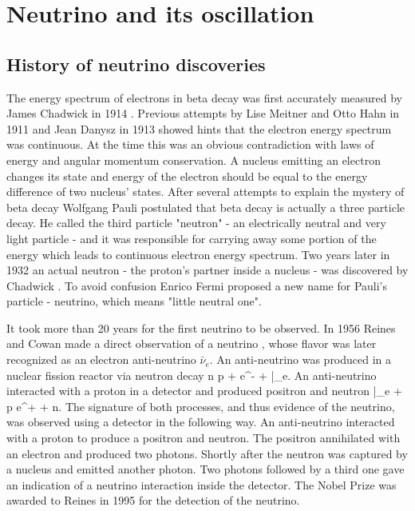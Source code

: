 \chapter{Neutrino and its oscillation}
\label{history_chapter}

\section{History of neutrino discoveries}
The energy spectrum of electrons in beta decay was first accurately measured by James Chadwick 
in 1914 \cite{chadwick}.  Previous attempts by Lise Meitner and Otto Hahn in 1911 and 
Jean Danysz in 1913 showed hints that the electron energy spectrum was continuous. 
At the time this was an obvious contradiction with laws of energy and angular momentum 
conservation. A nucleus emitting an electron changes its state and energy of the 
electron should be equal to the energy difference of two nucleus' states. After 
several attempts to explain the mystery of beta decay Wolfgang Pauli postulated 
\cite{pauli} that beta decay is actually a three particle decay. He called the third 
particle "neutron" - an electrically neutral and very light particle - and it was 
responsible for carrying away some portion of the energy which leads to continuous 
electron energy spectrum. Two years later in 1932 an actual neutron - the proton's 
partner inside a nucleus - was discovered by Chadwick \cite{chadwick2}.  To avoid 
confusion Enrico Fermi proposed a new name for Pauli's particle \cite{fermi} - 
neutrino, which means "little neutral one".

It took more than 20 years for the first neutrino to be observed.  In 1956 Reines 
and Cowan made a direct observation of a neutrino \cite{cowan}, whose flavor was 
later recognized as an electron anti-neutrino $\bar{\nu}_e$. An anti-neutrino was 
produced in a nuclear fission reactor via neutron decay
\be
n \rightarrow p + e^- + \bar{\nu}_e.
\ee
An anti-neutrino interacted with a proton in a detector and produced positron and neutron
\be
\bar{\nu}_e + p \rightarrow e^+ + n. 
\ee
The signature of both processes, and thus evidence of the neutrino, was observed using 
a detector in the following way. An anti-neutrino interacted with a proton to produce 
a positron and neutron.  The positron annihilated with an electron and produced two 
photons.  Shortly after the neutron was captured by a nucleus and emitted another photon.  
Two photons followed by a third one gave an indication of a neutrino interaction inside 
the detector. The Nobel Prize was awarded to Reines in 1995 for the detection of the neutrino.

